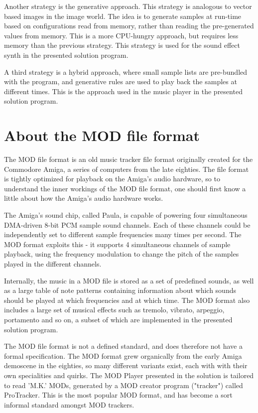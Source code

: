 Another strategy is the generative approach.
This strategy is analogous to vector based images in the image world.
The idea is to generate samples at run-time based on configurations read from memory, rather than reading the pre-generated values from memory.
This is a more CPU-hungry approach, but requires less memory than the previous strategy.
This strategy is used for the sound effect synth in the presented solution program.

A third strategy is a hybrid approach, where small sample lists are pre-bundled with the program, and generative rules are used to play back the samples at different times.
This is the approach used in the music player in the presented solution program.

\section{About the MOD file format}

The MOD file format is an old music tracker file format originally created for the Commodore Amiga, a series of computers from the late eighties.
The file format is tightly optimized for playback on the Amiga's audio hardware, so to understand the inner workings of the MOD file format, one should first know a little about how the Amiga's audio hardware works.

The Amiga's sound chip, called Paula, is capable of powering four simultaneous DMA-driven 8-bit PCM sample sound channels.
Each of these channels could be independently set to different sample frequencies many times per second.
The MOD format exploits this - it supports 4 simultaneous channels of sample playback, using the frequency modulation to change the pitch of the samples played in the different channels.

Internally, the music in a MOD file is stored as a set of predefined sounds, as well as a large table of note patterns containing information about which sounds should be played at which frequencies and at which time.
The MOD format also includes a large set of musical effects such as tremolo, vibrato, arpeggio, portamento and so on, a subset of which are implemented in the presented solution program.

The MOD file format is not a defined standard, and does therefore not have a formal specification.
The MOD format grew organically from the early Amiga demoscene in the eighties, so many different variants exist, each with with their own specialities and quirks.
The MOD Player presented in the solution is tailored to read 'M.K.' MODs, generated by a MOD creator program ("tracker") called ProTracker.
This is the most popular MOD format, and has become a sort informal standard amongst MOD trackers.

